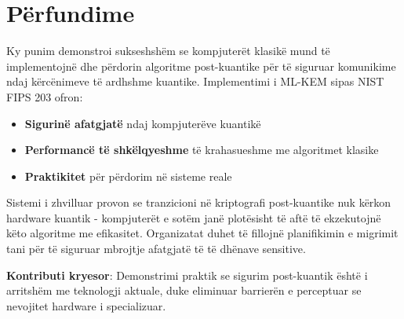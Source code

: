 \documentclass[conference]{IEEEtran}
\begin{document}
\section{Përfundime}

Ky punim demonstroi sukseshshëm se kompjuterët klasikë mund të implementojnë dhe përdorin algoritme post-kuantike për të siguruar komunikime ndaj kërcënimeve të ardhshme kuantike. Implementimi i ML-KEM sipas NIST FIPS 203 ofron:

\begin{itemize}
\item \textbf{Sigurinë afatgjatë} ndaj kompjuterëve kuantikë
\item \textbf{Performancë të shkëlqyeshme} të krahasueshme me algoritmet klasike
\item \textbf{Praktikitet} për përdorim në sisteme reale
\end{itemize}

Sistemi i zhvilluar provon se tranzicioni në kriptografi post-kuantike nuk kërkon hardware kuantik - kompjuterët e sotëm janë plotësisht të aftë të ekzekutojnë këto algoritme me efikasitet. Organizatat duhet të fillojnë planifikimin e migrimit tani për të siguruar mbrojtje afatgjatë të të dhënave sensitive.

\textbf{Kontributi kryesor}: Demonstrimi praktik se sigurim post-kuantik është i arritshëm me teknologji aktuale, duke eliminuar barrierën e perceptuar se nevojitet hardware i specializuar.
\end{document}
